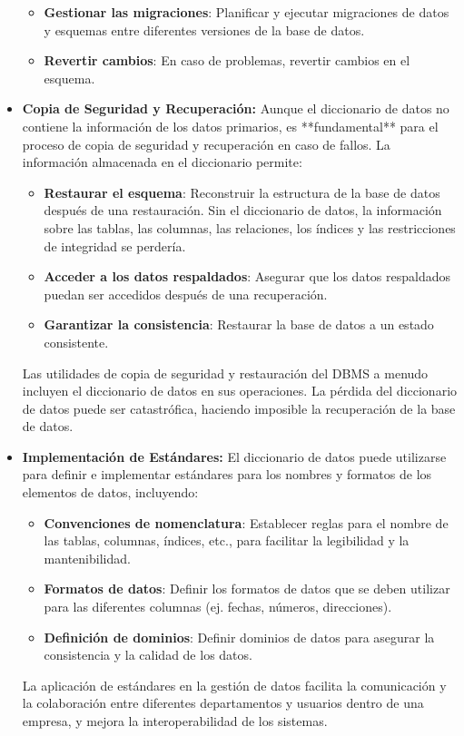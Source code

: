 \begin{itemize}
\begin{itemize}
        \item \textbf{Gestionar las migraciones}: Planificar y ejecutar migraciones de datos y esquemas entre diferentes versiones de la base de datos.
        \item \textbf{Revertir cambios}: En caso de problemas, revertir cambios en el esquema.
    \end{itemize}
    \item \textbf{Copia de Seguridad y Recuperación:} Aunque el diccionario de datos no contiene la información de los datos primarios, es **fundamental** para el proceso de copia de seguridad y recuperación en caso de fallos. La información almacenada en el diccionario permite:
    \begin{itemize}
        \item \textbf{Restaurar el esquema}: Reconstruir la estructura de la base de datos después de una restauración. Sin el diccionario de datos, la información sobre las tablas, las columnas, las relaciones, los índices y las restricciones de integridad se perdería.
        \item \textbf{Acceder a los datos respaldados}:  Asegurar que los datos respaldados puedan ser accedidos después de una recuperación.
        \item \textbf{Garantizar la consistencia}:  Restaurar la base de datos a un estado consistente.
    \end{itemize}
    Las utilidades de copia de seguridad y restauración del DBMS a menudo incluyen el diccionario de datos en sus operaciones.  La pérdida del diccionario de datos puede ser catastrófica, haciendo imposible la recuperación de la base de datos.
    \item \textbf{Implementación de Estándares:} El diccionario de datos puede utilizarse para definir e implementar estándares para los nombres y formatos de los elementos de datos, incluyendo:
    \begin{itemize}
        \item \textbf{Convenciones de nomenclatura}: Establecer reglas para el nombre de las tablas, columnas, índices, etc., para facilitar la legibilidad y la mantenibilidad.
        \item \textbf{Formatos de datos}: Definir los formatos de datos que se deben utilizar para las diferentes columnas (ej. fechas, números, direcciones).
        \item \textbf{Definición de dominios}: Definir dominios de datos para asegurar la consistencia y la calidad de los datos.
    \end{itemize}
    La aplicación de estándares en la gestión de datos facilita la comunicación y la colaboración entre diferentes departamentos y usuarios dentro de una empresa, y mejora la interoperabilidad de los sistemas.
\end{itemize}


